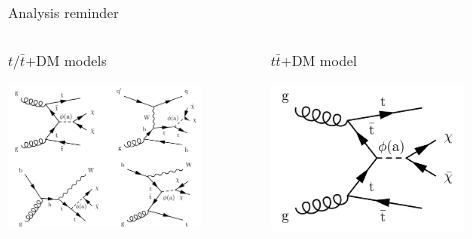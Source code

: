 \documentclass[8pt]{beamer}
\begin{document}
\begin{frame}{Analysis reminder}
\begin{columns}
	\begin{column}{0.49\textwidth}
		\begin{center}
			\begin{block}{ \centering $t/ \bar t$+DM models}\end{block}	
			\includegraphics[width=0.8\textwidth]{figs/tDMfeynman.png}
    		 \end{center}
	\end{column} \hfill
	\begin{column}{0.49\textwidth}
		\begin{center}
			\begin{block}{\centering $t \bar t$+DM model}\end{block}				
			\includegraphics[width=0.80\textwidth]{figs/ttDM.png}
    		 \end{center}
	\end{column} \hfill
\end{columns} \vfill
\end{frame}
\end{document}
